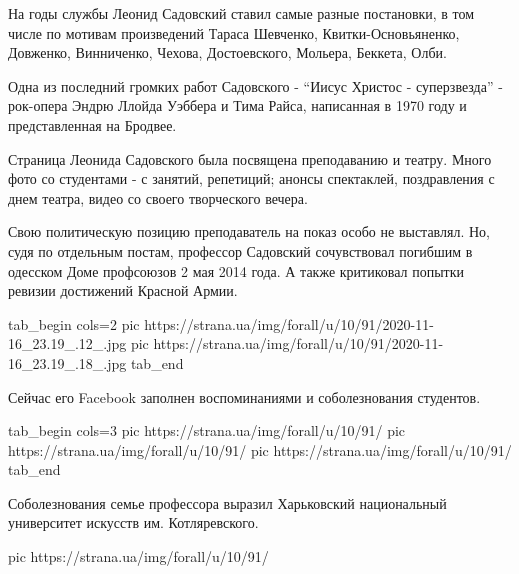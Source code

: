 На годы службы Леонид Садовский ставил самые разные постановки, в том
числе по мотивам произведений Тараса Шевченко, Квитки-Основьяненко,
Довженко, Винниченко, Чехова, Достоевского, Мольера, Беккета, Олби. 

Одна из последний громких работ Садовского - \enquote{Иисус Христос - суперзвезда}
- рок-опера Эндрю Ллойда Уэббера и Тима Райса, написанная в 1970 году и
представленная на Бродвее. 

Страница Леонида Садовского была посвящена преподаванию и театру. Много
фото со студентами - с занятий, репетиций; анонсы спектаклей, поздравления
с днем театра, видео со своего творческого вечера. 

Свою политическую позицию преподаватель на показ особо не выставлял. Но,
судя по отдельным постам, профессор Садовский сочувствовал погибшим в
одесском Доме профсоюзов 2 мая 2014 года. А также критиковал попытки
ревизии достижений Красной Армии.

\ifcmt
tab_begin cols=2
	pic https://strana.ua/img/forall/u/10/91/2020-11-16_23.19_.12_.jpg
	pic https://strana.ua/img/forall/u/10/91/2020-11-16_23.19_.18_.jpg
tab_end
\fi


Сейчас его Facebook заполнен воспоминаниями и соболезнования студентов. 

\ifcmt
tab_begin cols=3
pic https://strana.ua/img/forall/u/10/91/%
pic https://strana.ua/img/forall/u/10/91/%
pic https://strana.ua/img/forall/u/10/91/%
tab_end
\fi

Соболезнования семье профессора выразил Харьковский национальный
университет искусств им. Котляревского. 

\ifcmt
pic https://strana.ua/img/forall/u/10/91/%
\fi



